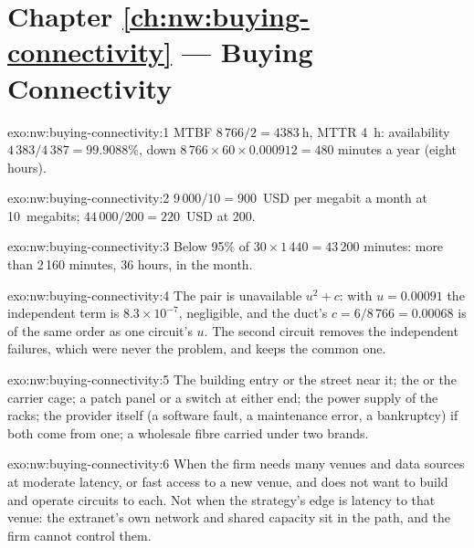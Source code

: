 \section*{Chapter \ref{ch:nw:buying-connectivity} --- Buying Connectivity}

\begin{solution}{exo:nw:buying-connectivity:1}
MTBF $8\,766/2 = \qty{4383}{\hour}$, MTTR \qty{4}{\hour}: availability $4\,383/4\,387 = 99.9088\%$, down $8\,766 \times 60 \times 0.000912 = 480$ minutes a
year (eight hours).
\end{solution}

\begin{solution}{exo:nw:buying-connectivity:2}
$9\,000/10 = 900$~USD per megabit a month at 10~megabits; $44\,000/200 = 220$~USD at 200.
\end{solution}

\begin{solution}{exo:nw:buying-connectivity:3}
Below 95\% of $30 \times 1\,440 = 43\,200$ minutes: more than 2\,160 minutes, 36 hours, in the month.
\end{solution}

\begin{solution}{exo:nw:buying-connectivity:4}
The pair is unavailable $u^2 + c$: with $u = 0.00091$ the independent term is $8.3 \times 10^{-7}$, negligible, and the duct's $c = 6/8\,766 = 0.00068$
is of the same order as one circuit's $u$. The second circuit removes the independent failures, which were never the problem, and keeps the common
one.
\end{solution}

\begin{solution}{exo:nw:buying-connectivity:5}
The building entry or the street near it; the  or the carrier cage; a patch panel or a switch at either end; the power supply of the
racks; the provider itself (a software fault, a maintenance error, a bankruptcy) if both come from one; a wholesale fibre carried under two brands.
\end{solution}

\begin{solution}{exo:nw:buying-connectivity:6}
When the firm needs many venues and data sources at moderate latency, or fast access to a new venue, and does not want to build and operate
circuits to each. Not when the strategy's edge is latency to that venue: the extranet's own network and shared capacity sit in the path, and the
firm cannot control them.
\end{solution}

